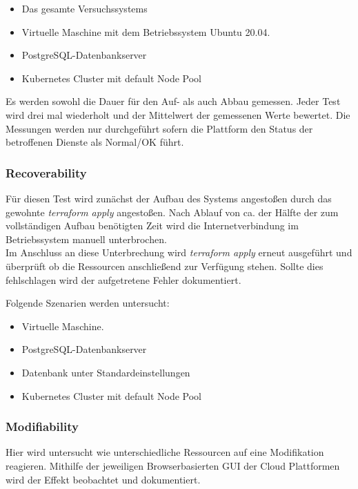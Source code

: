 \begin{spacing}{1.2}
\begin{itemize}
  \item Das gesamte Versuchssystems
  \item Virtuelle Maschine mit dem Betriebssystem Ubuntu 20.04.
  \item PostgreSQL-Datenbankserver
  \item Kubernetes Cluster mit default Node Pool
\end{itemize}

Es werden sowohl die Dauer für den Auf- als auch Abbau gemessen.
Jeder Test wird drei mal wiederholt und der Mittelwert der
gemessenen Werte bewertet. Die Messungen werden nur durchgeführt
sofern die Plattform den Status der betroffenen Dienste als Normal/OK
führt. 

\subsubsection{Recoverability}

Für diesen Test wird zunächst der Aufbau des Systems angestoßen
durch das gewohnte \textit{terraform apply} angestoßen. Nach 
Ablauf von ca. der Hälfte der zum vollständigen Aufbau benötigten
Zeit wird die Internetverbindung im Betriebssystem manuell
unterbrochen.\\
Im Anschluss an diese Unterbrechung wird \textit{terraform apply}
erneut ausgeführt und überprüft ob die Ressourcen anschließend
zur Verfügung stehen. Sollte dies fehlschlagen wird der aufgetretene
Fehler dokumentiert.

Folgende Szenarien werden untersucht:

\begin{itemize}
  \item Virtuelle Maschine.
  \item PostgreSQL-Datenbankserver
  \item Datenbank unter Standardeinstellungen
  \item Kubernetes Cluster mit default Node Pool
\end{itemize}

\subsubsection{Modifiability}

Hier wird untersucht wie unterschiedliche Ressourcen auf eine
Modifikation reagieren. Mithilfe der jeweiligen Browserbasierten
GUI der Cloud Plattformen wird der Effekt beobachtet und dokumentiert.


\end{spacing}
